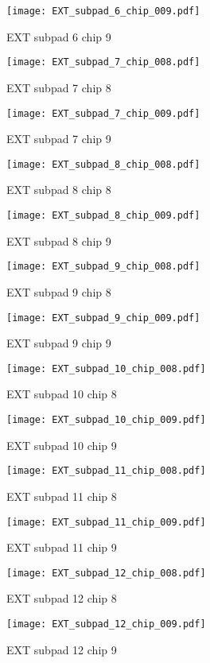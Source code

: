 \documentclass[a4paper,11pt]{article}
\begin{document}
\begin{figure}[htbp] \centering\texttt{[image: EXT\_subpad\_6\_chip\_009.pdf]}\caption{EXT subpad 6 chip 9} \end{figure} 
\begin{figure}[htbp] \centering\texttt{[image: EXT\_subpad\_7\_chip\_008.pdf]}\caption{EXT subpad 7 chip 8} \end{figure} 
\begin{figure}[htbp] \centering\texttt{[image: EXT\_subpad\_7\_chip\_009.pdf]}\caption{EXT subpad 7 chip 9} \end{figure} 
\begin{figure}[htbp] \centering\texttt{[image: EXT\_subpad\_8\_chip\_008.pdf]}\caption{EXT subpad 8 chip 8} \end{figure} 
\begin{figure}[htbp] \centering\texttt{[image: EXT\_subpad\_8\_chip\_009.pdf]}\caption{EXT subpad 8 chip 9} \end{figure} 
\begin{figure}[htbp] \centering\texttt{[image: EXT\_subpad\_9\_chip\_008.pdf]}\caption{EXT subpad 9 chip 8} \end{figure} 
\begin{figure}[htbp] \centering\texttt{[image: EXT\_subpad\_9\_chip\_009.pdf]}\caption{EXT subpad 9 chip 9} \end{figure} 
\begin{figure}[htbp] \centering\texttt{[image: EXT\_subpad\_10\_chip\_008.pdf]}\caption{EXT subpad 10 chip 8} \end{figure} 
\begin{figure}[htbp] \centering\texttt{[image: EXT\_subpad\_10\_chip\_009.pdf]}\caption{EXT subpad 10 chip 9} \end{figure} 
\begin{figure}[htbp] \centering\texttt{[image: EXT\_subpad\_11\_chip\_008.pdf]}\caption{EXT subpad 11 chip 8} \end{figure} 
\begin{figure}[htbp] \centering\texttt{[image: EXT\_subpad\_11\_chip\_009.pdf]}\caption{EXT subpad 11 chip 9} \end{figure} 
\begin{figure}[htbp] \centering\texttt{[image: EXT\_subpad\_12\_chip\_008.pdf]}\caption{EXT subpad 12 chip 8} \end{figure} 
\begin{figure}[htbp] \centering\texttt{[image: EXT\_subpad\_12\_chip\_009.pdf]}\caption{EXT subpad 12 chip 9} \end{figure}
\end{document}
